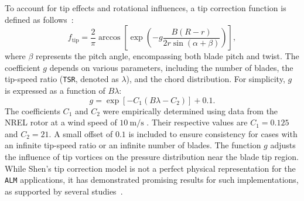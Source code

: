 \documentclass[11pt,a4paper]{article}
\begin{document}
%
To account for tip effects and rotational influences, a tip correction function is defined as follows~\citep{shen2012actuator}:
\[
f_{\text{tip}} = \frac{2}{\pi} \arccos \left[\exp \left(-g \frac{B(R-r)}{2 r \sin (\alpha+\beta)}\right)\right],
\]
where $\beta$ represents the pitch angle, encompassing both blade pitch and twist. The coefficient $g$ depends on various parameters, including the number of blades, the tip-speed ratio (\texttt{TSR}, denoted as $\lambda$), and the chord distribution. For simplicity, $g$ is expressed as a function of $B\lambda$:
\[
g = \exp \left[-C_1\left(B \lambda - C_2\right)\right] + 0.1.
\]
The coefficients $C_1$ and $C_2$ were empirically determined using data from the NREL rotor at a wind speed of $10~\mathrm{m/s}$ \citep{shen2005tip}. Their respective values are $C_1 = 0.125$ and $C_2 = 21$. A small offset of $0.1$ is included to ensure consistency for cases with an infinite tip-speed ratio or an infinite number of blades. The function $g$ adjusts the influence of tip vortices on the pressure distribution near the blade tip region. While Shen's tip correction model is not a perfect physical representation for the \texttt{ALM} applications, it has demonstrated promising results for such implementations, as supported by several studies~\citep{shen2014study,yu2018study,papi2021development}.





\end{document}
